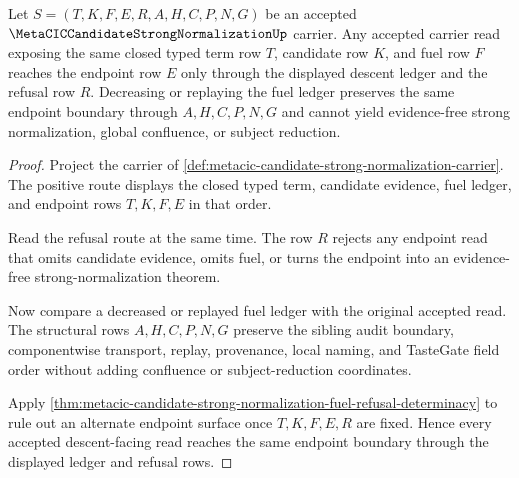 \begin{theorem}
\label{thm:metacic-candidate-strong-normalization-candidate-fuel-endpoint-descent}
Let $S=(T,K,F,E,R,A,H,C,P,N,G)$ be an accepted $\MetaCICCandidateStrongNormalizationUp$ carrier. Any accepted carrier read exposing the same closed typed term row $T$, candidate row $K$, and fuel row $F$ reaches the endpoint row $E$ only through the displayed descent ledger and the refusal row $R$. Decreasing or replaying the fuel ledger preserves the same endpoint boundary through $A,H,C,P,N,G$ and cannot yield evidence-free strong normalization, global confluence, or subject reduction.
\end{theorem}
\begin{proof}
Project the carrier of \autoref{def:metacic-candidate-strong-normalization-carrier}. The positive route displays the closed typed term, candidate evidence, fuel ledger, and endpoint rows $T,K,F,E$ in that order.

Read the refusal route at the same time. The row $R$ rejects any endpoint read that omits candidate evidence, omits fuel, or turns the endpoint into an evidence-free strong-normalization theorem.

Now compare a decreased or replayed fuel ledger with the original accepted read. The structural rows $A,H,C,P,N,G$ preserve the sibling audit boundary, componentwise transport, replay, provenance, local naming, and TasteGate field order without adding confluence or subject-reduction coordinates.

Apply \autoref{thm:metacic-candidate-strong-normalization-fuel-refusal-determinacy} to rule out an alternate endpoint surface once $T,K,F,E,R$ are fixed. Hence every accepted descent-facing read reaches the same endpoint boundary through the displayed ledger and refusal rows.
\end{proof}

